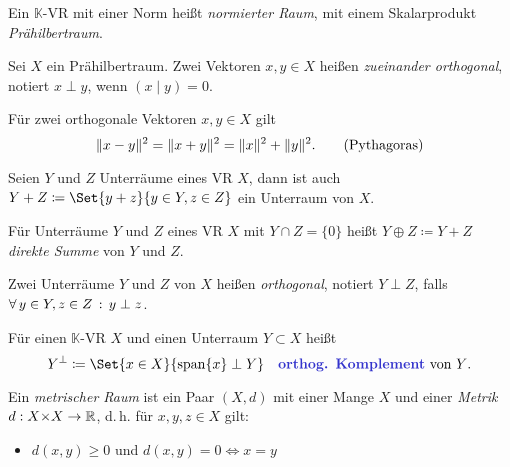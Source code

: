 \documentclass{cheat-sheet}
\newcommand{\K}{\mathbb{K}}
\newcommand{\scp}[2]{\left( #1 \!\mid\! #2 \right)} %
\begin{document}
\begin{defn}
  Ein $\K$-VR mit einer Norm heißt \emph{normierter Raum}, mit einem Skalarprodukt \emph{Prähilbertraum}.
\end{defn}

\begin{defn}
  Sei $X$ ein Prähilbertraum. Zwei Vektoren $x, y \in X$ heißen \emph{zueinander orthogonal}, notiert $x \perp y$, wenn $\scp{x}{y} = 0$.
\end{defn}

\begin{satz}
  Für zwei orthogonale Vektoren $x, y \in X$ gilt
  \[ \lVert x - y\rVert^2 = \lVert x + y\rVert^2 = \lVert x\rVert^2 + \lVert y\rVert^2. \tag*{(Pythagoras)} \]
\end{satz}

\begin{lem}
  Seien $Y$ und $Z$ Unterräume eines VR $X$, dann ist auch $Y + Z \coloneqq \Set{ y + z }{ y \in Y, z \in Z }$ ein Unterraum von $X$.
\end{lem}

\begin{defn}
  Für Unterräume $Y$ und $Z$ eines VR $X$ mit $Y \cap Z = \{ 0 \}$ heißt $Y \oplus Z \coloneqq Y + Z$ \emph{direkte Summe} von $Y$ und $Z$.
\end{defn}

\begin{defn}
  Zwei Unterräume $Y$ und $Z$ von $X$ heißen \emph{orthogonal}, notiert $Y \perp Z$, falls $\forall \, {y \in Y, z \in Z} \,:\, y \perp z$.
\end{defn}

\begin{defn}
  Für einen $\K$-VR $X$ und einen Unterraum $Y \subset X$ heißt
  \[ Y^\perp \coloneqq \Set{ x \in X }{ \mathrm{span} \{ x \} \perp Y } \quad \text{\emph{orthog. Komplement} von $Y$}. \]
\end{defn}


\begin{defn}
  Ein \emph{metrischer Raum} ist ein Paar $(X, d)$ mit einer Mange $X$ und einer \emph{Metrik} $d : X {\times} X \to \mathbb{R}$, d.\,h. für $x, y, z \in X$ gilt:
  \begin{itemize}
    \item $d(x, y) \geq 0$ \enspace und \enspace $d(x, y) = 0 \iff x = y$ 
  \end{itemize}
\end{defn}
\end{document}
